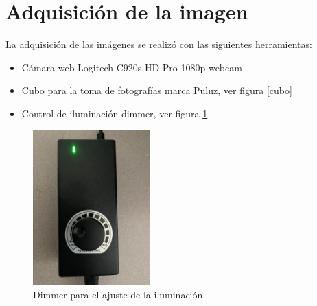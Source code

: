 \documentclass[a4paper, 11pt]{article}
\begin{document}












\section{Adquisición de la imagen}

La adquisición de las imágenes se realizó con las siguientes herramientas:

\begin{itemize}
\item Cámara web Logitech C920s HD Pro 1080p webcam 
\item Cubo para la toma de fotografías marca Puluz, ver figura \ref{cubo}
\item Control de iluminación dimmer, ver figura \ref{dimmer}
\end{itemize}

\begin{figure}[ht]
\centering
\includegraphics[width=0.4\textwidth]{dimer1}
\caption{Dimmer para el ajuste de la iluminación.}
\label{dimmer}
\end{figure}
\end{document}
